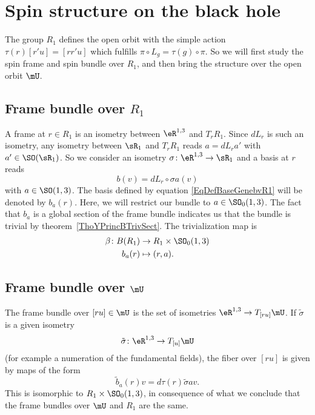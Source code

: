 \section{Spin structure on the black hole}

The group $R_1$ defines the open orbit with the simple action $\tau(r)[r'u]=[rr'u]$ which fulfills $\pi\circ L_g=\tau(g)\circ\pi$. So we will first study the spin frame and spin bundle over $R_1$, and then bring the structure over the open orbit $\mU$.

\subsection{Frame bundle over \texorpdfstring{$R_1$}{R1}}

A frame at $r\in R_1$ is an isometry between $\eR^{1,3}$ and $T_rR_1$. Since $dL_r$ is such an isometry, any isometry between $\sR_1$ and $T_rR_1$ reads $a=dL_ra'$ with $a'\in\SO(\sR_1)$. So we consider an isometry $\sigma\colon \eR^{1,3}\to \sR_1$ and a basis at $r$ reads
\begin{equation}   \label{EqDefBaseGenebvR1}
	b(v)=dL_r\circ\sigma a(v)
\end{equation}
with $a\in \SO(1,3)$. The basis defined by equation \eqref{EqDefBaseGenebvR1} will be denoted by $b_a(r)$. Here, we will restrict our bundle to $a\in \SO_0(1,3)$. The fact that $b_a$ is a global section of the frame bundle indicates us that the bundle is trivial by theorem~\ref{ThoYPrincBTrivSect}. The trivialization map is
\begin{equation}
	\begin{aligned}
		\beta\colon B(R_1) & \to R_1\times \SO_0(1,3) \\
		b_a(r)             & \mapsto (r,a).
	\end{aligned}
\end{equation}


\subsection{Frame bundle over \texorpdfstring{$\mU$}{U}}

The frame bundle over $[ru]\in \mU$ is the set of isometries $\eR^{1,3}\to T_{[ru]}\mU$. If $\tilde\sigma$ is a given isometry
\[
	\tilde\sigma\colon \eR^{1,3}\to T_{[u]}\mU
\]
(for example a numeration of the fundamental fields), the fiber over $[ru]$ is given by maps of the form
\begin{equation}
	\tilde b_a(r)v=d\tau(r)\tilde\sigma av.
\end{equation}
This is isomorphic to $R_1\times\SO_0(1,3)$, in consequence of what we conclude that the frame bundles over $\mU$ and $R_1$ are the same.
